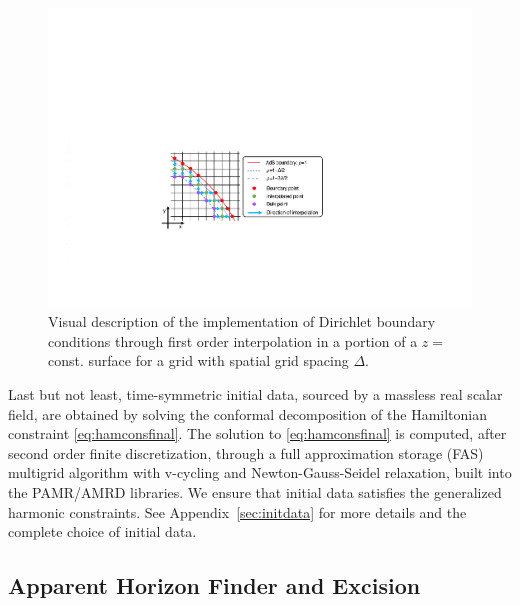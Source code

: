 \documentclass[aps,letterpaper,twocolumn,nofootinbib]{revtex4}
\numberwithin{equation}{section}
\begin{document}
\begin{figure}[t!]
        \centering
        \includegraphics[width=6.0in,clip=true]{Dirichlet_conditions.pdf}
\parbox{5.0in}{\caption{Visual description of the implementation of Dirichlet boundary conditions through first order interpolation in a portion of a $z=$const. surface for a grid with spatial grid spacing $\Delta$.
        }\label{fig:lego_circle_dirbc}}
\end{figure}

Last but not least, time-symmetric initial data, sourced by a massless real scalar field, are obtained by solving the conformal decomposition of the Hamiltonian constraint \eqref{eq:hamconsfinal}. 
The solution to \eqref{eq:hamconsfinal} is computed, after second order finite discretization, through a full approximation storage (FAS) multigrid algorithm with v-cycling and Newton-Gauss-Seidel relaxation, built into the PAMR/AMRD libraries. We ensure that initial data satisfies the generalized harmonic constraints. See Appendix~\ref{sec:initdata} for more details and the complete choice of initial data.

\subsection{Apparent Horizon Finder and Excision}
\label{sec:AH_exc}
\end{document}
